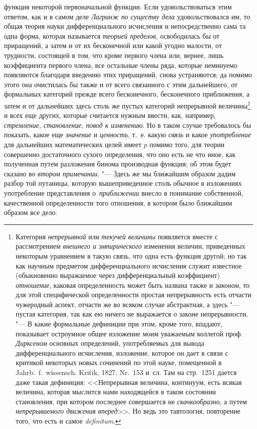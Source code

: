 функция некоторой первоначальной функции. Если удовольствоваться этим ответом,
как и в самом деле {\em Лагранж по существу дела} удовольствовался им, то общая
теория науки дифференциального исчисления и непосредственно сама та одна форма,
которая называется {\em теорией пределов}, освободилась бы от приращений, а
затем и от их бесконечной или какой угодно малости, от трудности, состоящей в
том, что кроме первого члена или, вернее, лишь коэффициента первого члена, все
остальные члены ряда, которые неминуемо появляются благодаря введению этих
приращений, снова устраняются; да помимо этого она очистилась бы также и от
всего связанного с этим дальнейшего, от формальных категорий прежде всего
бесконечного, бесконечного приближения, а затем и от дальнейших здесь столь же
пустых категорий непрерывной величины\footnote{Категория {\em непрерывной} или
{\em текучей величины} появляется вместе с рассмотрением
{\em внешнего и эмпирического} изменения величин, приведенных некоторым
уравнением в такую связь, что одна есть функция другой; но так как научным
предметом дифференциального исчисления служит известное (обыкновенно выражаемое
через дифференциальный коэффициент) {\em отношение}, каковая определенность
может быть названа также и {\em законом}, то для этой специфической
определенности простая непрерывность есть отчасти чужеродный аспект, отчасти же
во всяком случае абстрактная, а здесь "--- пустая категория, так как ею ничего
не выражается о законе непрерывности. "--- В какие формальные дефиниции при
этом, кроме того, впадают, показывает остроумное общее изложение моим уважаемым
коллегой проф. {\em Дирксеном} основных определений, употребляемых для вывода
дифференциального исчисления, изложение, которое он дает в связи с критикой
некоторых новых сочинений по этой науке, помещенной в Jahrb.~f.~wissensch.
Kritik, 1827, Nr.~153 и~сл. Там на стр.~1251 дается даже такая дефиниция:
<<Непрерывная величина, континуум, есть всякая величина, которая мыслится нами
находящейся в таком состоянии становления, при котором последнее совершается не
{\em скачкообразно}, а путем {\em непрерываемого движения вперед}>>. Но ведь
это тавтология, повторение того, что есть и самое {\em de\-fi\-ni\-tum}.} и
всех еще других, которые считается нужным ввести, как, например,
{\em стремление, становление, повод к изменению}. Но в таком случае требовалось
бы показать, какое еще {\em значение} и {\em ценность}, т.~е. какую {\em связь}
и какое {\em употребление} для дальнейших математических целей имеет $p$ помимо
того, для теории совершенно достаточного сухого определения, что оно есть не
что иное, как полученная путем разложения бинома производная функция; об этом
будет сказано во {\em втором примечании}. "--- Здесь же мы ближайшим образом
дадим разбор той путаницы, которую вышеприведенное столь обычное в изложениях
употребление представления о~{\em приближении} внесло в понимание собственной,
качественной определенности того отношения, в котором было ближайшим образом
все дело.

